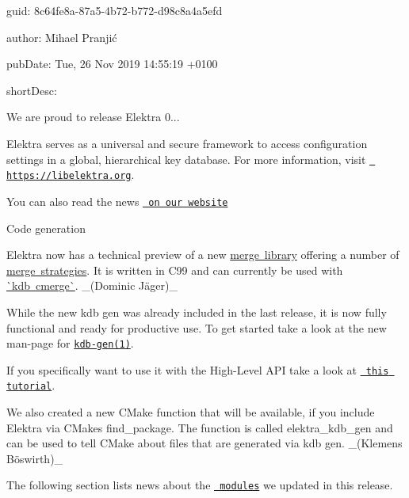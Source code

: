 
\begin{DoxyItemize}
\item guid\+: 8c64fe8a-\/87a5-\/4b72-\/b772-\/d98c8a4a5efd
\item author\+: Mihael Pranjić
\item pub\+Date\+: Tue, 26 Nov 2019 14\+:55\+:19 +0100
\item short\+Desc\+:
\end{DoxyItemize}

We are proud to release Elektra 0...

Elektra serves as a universal and secure framework to access configuration settings in a global, hierarchical key database. For more information, visit \href{https://libelektra.org}{\texttt{ https\+://libelektra.\+org}}.

You can also read the news \href{https://www.libelektra.org/news/0.9.1-release}{\texttt{ on our website}}


\begin{DoxyItemize}
\item Code generation
\item Elektra now has a technical preview of a new \mbox{\hyperlink{doc_tutorials_cmerge_md}{merge library}} offering a number of \mbox{\hyperlink{doc_help_elektra-cmerge-strategy_md}{merge strategies}}. It is written in C99 and can currently be used with \mbox{\hyperlink{doc_help_kdb-cmerge_md}{\`{}kdb cmerge\`{}}}. \+\_\+(Dominic Jäger)\+\_\+
\end{DoxyItemize}

While the new {\ttfamily kdb gen} was already included in the last release, it is now fully functional and ready for productive use. To get started take a look at the new man-\/page for \href{https://www.libelektra.org/manpages/kdb-gen}{\texttt{ {\ttfamily kdb-\/gen(1)}}}.

If you specifically want to use it with the High-\/\+Level A\+PI take a look at \href{https://www.libelektra.org/tutorials/high-level-api}{\texttt{ this tutorial}}.

We also created a new C\+Make function that will be available, if you include Elektra via C\+Make\textquotesingle{}s {\ttfamily find\+\_\+package}. The function is called {\ttfamily elektra\+\_\+kdb\+\_\+gen} and can be used to tell C\+Make about files that are generated via {\ttfamily kdb gen}. \+\_\+(Klemens Böswirth)\+\_\+

The following section lists news about the \href{https://www.libelektra.org/plugins/readme}{\texttt{ modules}} we updated in this release.


